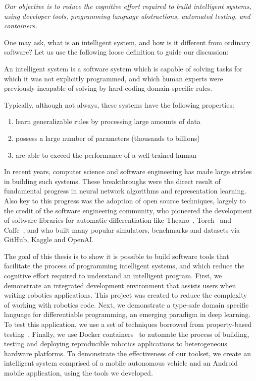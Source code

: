 \documentclass[12pt,initial,twoside,maitrise]{dms}
\numberwithin{equation}{section}
\numberwithin{table}{chapter}
\numberwithin{figure}{chapter}
\begin{document}
\textit{Our objective is to reduce the cognitive effort required to build intelligent systems, using developer tools, programming language abstractions, automated testing, and containers.}

One may ask, what is an intelligent system, and how is it different from ordinary software? Let us use the following loose definition to guide our discussion:

An intelligent system is a software system which is capable of solving tasks for which it was not explicitly programmed, and which human experts were previously incapable of solving by hard-coding domain-specific rules.

Typically, although not always, these systems have the following properties:

\begin{enumerate}
    \item learn generalizable rules by processing large amounts of data
    \item possess a large number of parameters (thousands to billions)
    \item are able to exceed the performance of a well-trained human
\end{enumerate}

In recent years, computer science and software engineering has made large strides in building such systems. These breakthroughs were the direct result of fundamental progress in neural network algorithms and representation learning. Also key to this progress was the adoption of open source techniques, largely to the credit of the software engineering community, who pioneered the development of software libraries for automatic differentiation like Theano~\cite{DBLP:journals-corr-Al-RfouAAa16}, Torch~\cite{collobert2002torch} and Caffe~\cite{jia2014caffe}, and who built many popular simulators, benchmarks and datasets via GitHub, Kaggle and OpenAI.

The goal of this thesis is to show it is possible to build software tools that facilitate the process of programming intelligent systems, and which reduce the cognitive effort required to understand an intelligent program. First, we demonstrate an integrated development environment that assists users when writing robotics applications. This project was created to reduce the complexity of working with robotics code. Next, we demonstrate a type-safe domain specific language for differentiable programming, an emerging paradigm in deep learning. To test this application, we use a set of techniques borrowed from property-based testing~\cite{fink1997property}. Finally, we use Docker containers~\cite{merkel2014docker} to automate the process of building, testing and deploying reproducible robotics applications to heterogeneous hardware platforms. To demonstrate the effectiveness of our toolset, we create an intelligent system comprised of a mobile autonomous vehicle and an Android mobile application, using the tools we developed.
\end{document}
